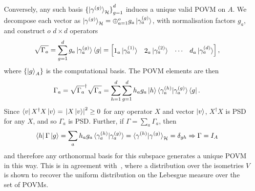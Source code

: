 \documentclass[10pt, a4paper]{article}
\numberwithin{equation}{section} %
\theoremstyle{definition}
\theoremstyle{plain}
\newcommand{\abs}[1]{\mathop{}\left\lvert#1\right\rvert}
\newcommand{\?}{\mathrel{?}} %
\newcommand{\Hs}{\mathcal{H}} %
\begin{document}
                  Conversely, any such basis \({\{\ket{\gamma^{(g)}}_{\Hs}\}}_{g=1}^d\) induces a unique valid POVM on \(A\). We decompose each vector as \(\ket{\gamma^{(g)}}_{\Hs} = \oplus_{a=1}^o g_a \ket{\gamma^{(g)}_a}\), with normalisation factors \(g_a\), and construct \(o\) \(d\times{d}\) operators 
                  \begin{equation}
                    \sqrt{\Gamma_a} = \sum_{g=1}^d g_a \ket{\gamma^{(g)}_a}\bra{g} = \begin{bmatrix} 1_a \ket{\gamma^{(1)}_a} & 2_a \ket{\gamma^{(2)}_a} & \cdots & d_a \ket{\gamma^{(d)}_a} \end{bmatrix},
                  \end{equation}
                  where \({\{\ket{g}_A\}}\) is the computational basis. The POVM elements are then 
                  \begin{equation}
                    \Gamma_a = \sqrt{\Gamma_a}^{\dagger}\sqrt{\Gamma_a} = \sum_{h=1}^d \sum_{g=1}^d h_a g_a \ket{h}\braket{\gamma^{(h)}_a|\gamma^{(g)}_a}\bra{g}.
                  \end{equation}
                  Since \(\bra{v}X^{\dagger}X\ket{v} = \abs{X\ket{v}}^2 \geq 0\) for any operator \(X\) and vector \(\ket{v}\), \(X^{\dagger}X\) is PSD for any \(X\), and so \(\Gamma_a\) is PSD. Further, if \(\Gamma = \sum_a \Gamma_a\), then 
                  \begin{equation}
                    \bra{h}\Gamma\ket{g} = \sum_a h_a g_a \braket{\gamma^{(h)}_a|\gamma^{(g)}_a} = \braket{\gamma^{(h)}|\gamma^{(g)}}_{\Hs} = \delta_{gh} \Rightarrow \Gamma = I_A
                  \end{equation}
                  and therefore any orthonormal basis for this subspace generates a unique POVM in this way. This is in agreement with~\cite{RandPOVM}, where a distribution over the isometries \(V\) is shown to recover the uniform distribution on the Lebesgue measure over the set of POVMs.
\end{document}

